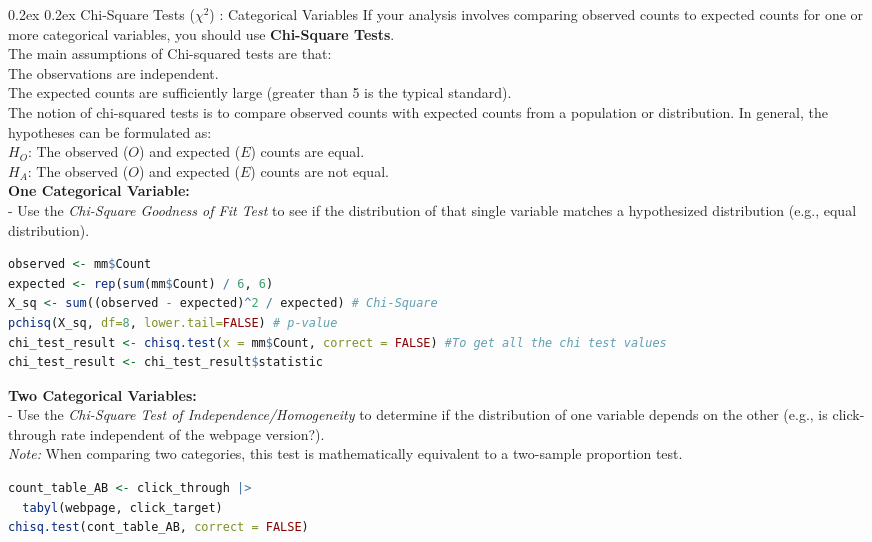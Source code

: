 \documentclass[8pt,landscape]{article}
\makeatletter
\renewcommand{\subsection}{\@startsection{subsection}{2}{0pt}%
    {0.2ex}%
    {0.2ex}%
    {\fontsize{8}{8}\bfseries\color{blue}}} %
\newcommand{\smalltext}[1]{%
  {\fontsize{8}{7}\selectfont\sloppy #1\par}%
}
\makeatother
\begin{document}
\begin{multicols}{3}
{\subsection{Chi-Square Tests ($\chi^2$) : Categorical Variables}  
If your analysis involves comparing observed counts to expected counts for one or more categorical variables, you should use \textbf{Chi-Square Tests}. \\
The main assumptions of Chi-squared tests are that:\\
The observations are independent.\\
The expected counts are sufficiently large (greater than 5 is the typical standard). \\
The notion of chi-squared tests is to compare observed counts with expected counts from a population or distribution. In general, the hypotheses can be formulated as: \\
$H_O$: The observed ($O$) and expected ($E$) counts are equal. \\
$H_A$: The observed ($O$) and expected ($E$) counts are not equal. \\
\textbf{One Categorical Variable:} \\
- Use the \textit{Chi-Square Goodness of Fit Test} to see if the distribution of that single variable matches a hypothesized distribution (e.g., equal distribution).
}
\begin{lstlisting}[language=R]
observed <- mm$Count
expected <- rep(sum(mm$Count) / 6, 6)
X_sq <- sum((observed - expected)^2 / expected) # Chi-Square 
pchisq(X_sq, df=8, lower.tail=FALSE) # p-value 
chi_test_result <- chisq.test(x = mm$Count, correct = FALSE) #To get all the chi test values
chi_test_result <- chi_test_result$statistic
\end{lstlisting}
\smalltext{
\textbf{Two Categorical Variables:}  \\
- Use the \textit{Chi-Square Test of Independence/Homogeneity} to determine if the distribution of one variable depends on the other (e.g., is click-through rate independent of the webpage version?).  
\\
\textit{Note:} When comparing two categories, this test is mathematically equivalent to a two-sample proportion test.
}
\begin{lstlisting}[language=R]
count_table_AB <- click_through |>
  tabyl(webpage, click_target)
chisq.test(cont_table_AB, correct = FALSE)
\end{lstlisting}
\smalltext{

}
\end{multicols}
\end{document}
